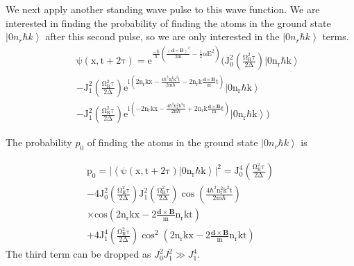 \documentclass[twocolumn,english,pra,aps,superscriptaddress,floatfix]{revtex4-1}
\begin{document}
We next apply another standing wave pulse to this wave function. We are interested in finding the probability of finding the atoms in the ground state $\left|0n_r\hbar k\right>$ after this second pulse, so we are only interested in the $\left|0n_r\hbar k\right>$ terms.
\begin{eqnarray}
&&\mathrm{\psi(x,t+2\tau)=\mathrm{e^{\frac{-it}{\hbar}\left(\frac{\left(\mathbf{d}\times\mathbf{B}\right)^2}{2m}-\frac{1}{2}\alpha E^2\right)}\bigg(J_0^2\left(\frac{\Omega_R^2\tau}{2\Delta}\right)\left|0n_r\hbar k\right>}}\nonumber \\
&&-\mathrm{J_1^2\left(\frac{\Omega_R^2\tau}{2\Delta}\right)e^{i\left(2n_rkx-\frac{4\hbar^2n_r^2k^2t}{2m\hbar}-2n_rk\frac{\mathbf{d}\times\mathbf{B}}{m}t\right)}\left|0n_r\hbar k\right>}\nonumber \\
&&-\mathrm{J_1^2\left(\frac{\Omega_R^2\tau}{2\Delta}\right)e^{i\left(-2n_rkx-\frac{4\hbar^2n_r^2k^2t}{2m\hbar}+2n_rk\frac{\mathbf{d}\times\mathbf{B}}{m}t\right)}\left|0n_r\hbar k\right>\bigg)}
\end{eqnarray}

The probability $p_0$ of finding the atoms in the ground state $\left|0n_r\hbar k\right>$ is

\begin{eqnarray}
\mathrm{p_0=|\left<\psi(x,t+2\tau)|0n_r\hbar k\right>|^2=J_0^4\left(\frac{\Omega_R^2\tau}{2\Delta}\right)}\nonumber \\
\mathrm{-4J_0^2\left(\frac{\Omega_R^2\tau}{2\Delta}\right)J_1^2\left(\frac{\Omega_R^2\tau}{2\Delta}\right)\cos{\left(\frac{4\hbar^2n_r^2k^2t}{2m\hbar}\right)}}\nonumber \\
\mathrm{\times cos{\left(2n_rkx-2\frac{\mathbf{d}\times\mathbf{B}}{m}n_rkt\right)}} \nonumber \\
\mathrm{+4J_1^4\left(\frac{\Omega_R^2\tau}{2\Delta}\right)\cos^2{\left(2n_rkx-2\frac{\mathbf{d}\times\mathbf{B}}{m}n_rkt\right)}}
\label{prob1}
\end{eqnarray}
The third term can be dropped as $J_0^2J_1^2\gg J_1^4$.  
\end{document}
